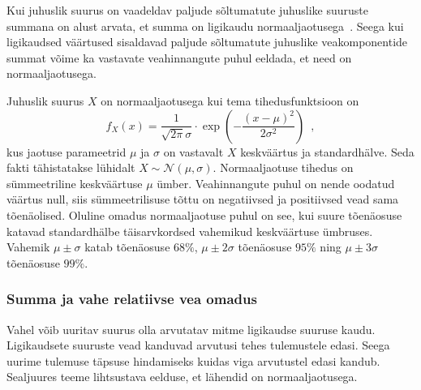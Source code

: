 Kui juhuslik suurus on vaadeldav paljude sõltumatute juhuslike suuruste summana on alust arvata, et summa on ligikaudu normaaljaotusega~\cite{tõenäosusteooria-algkursus}. Seega kui ligikaudsed väärtused sisaldavad paljude sõltumatute juhuslike veakomponentide summat võime ka vastavate veahinnangute puhul eeldada, et need on normaaljaotusega.

Juhuslik suurus $X$ on normaaljaotusega kui tema tihedusfunktsioon on
\begin{equation*}
    f_X(x) = \frac{1}{\sqrt{2 \pi} \sigma} \cdot \exp{\left( -\frac{(x - \mu)^2}{2\sigma^2} \right)} \enspace,
\end{equation*}
kus jaotuse parameetrid $\mu$ ja $\sigma$ on vastavalt $X$ keskväärtus ja standardhälve. Seda fakti tähistatakse lühidalt $X \sim \mathcal{N}(\mu, \sigma)$. Normaaljaotuse tihedus on sümmeetriline keskväärtuse $\mu$ ümber. Veahinnangute puhul on nende oodatud väärtus null, siis sümmeetrilisuse tõttu on negatiivsed ja positiivsed vead sama tõenäolised. Oluline omadus normaaljaotuse puhul on see, kui suure tõenäosuse katavad standardhälbe täisarvkordsed vahemikud keskväärtuse ümbruses. Vahemik $\mu \pm \sigma$ katab tõenäosuse $68\%$, $\mu \pm 2\sigma$ tõenäosuse $95\%$ ning $\mu \pm 3\sigma$ tõenäosuse $99\%$.

\subsubsection{Summa ja vahe relatiivse vea omadus}
Vahel võib uuritav suurus olla arvutatav mitme ligikaudse suuruse kaudu. Ligikaudsete suuruste vead kanduvad arvutusi tehes tulemustele edasi. Seega uurime tulemuse täpsuse hindamiseks kuidas viga arvutustel edasi kandub. Sealjuures teeme lihtsustava eelduse, et lähendid on normaaljaotusega.

